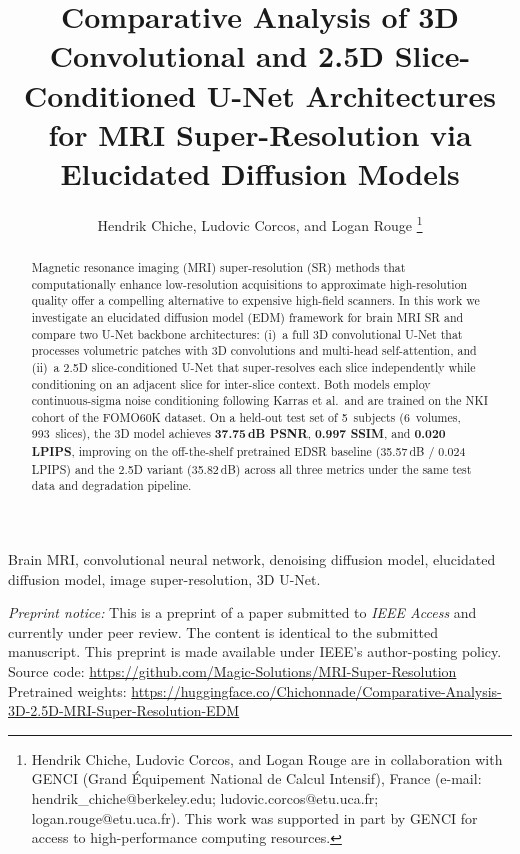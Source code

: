 \documentclass[10pt,journal]{IEEEtran}
\begin{document}
\title{Comparative Analysis of 3D Convolutional and 2.5D Slice-Conditioned
U-Net Architectures for MRI Super-Resolution via Elucidated Diffusion Models}

\author{Hendrik Chiche, Ludovic Corcos, and Logan Rouge%
\thanks{Hendrik Chiche, Ludovic Corcos, and Logan Rouge are in collaboration with GENCI (Grand \'{E}quipement National de Calcul Intensif), France (e-mail: hendrik\_chiche@berkeley.edu; ludovic.corcos@etu.uca.fr; logan.rouge@etu.uca.fr). This work was supported in part by GENCI for access to high-performance computing resources.}%
}

\begin{abstract}
Magnetic resonance imaging (MRI) super-resolution (SR) methods that
computationally enhance low-resolution acquisitions to approximate
high-resolution quality offer a compelling alternative to expensive
high-field scanners.
In this work we investigate an elucidated diffusion model (EDM) framework
for brain MRI SR and compare two U-Net backbone architectures:
(i)~a full 3D convolutional U-Net that processes volumetric patches
with 3D convolutions and multi-head self-attention, and
(ii)~a 2.5D slice-conditioned U-Net that super-resolves each slice
independently while conditioning on an adjacent slice for inter-slice
context.  Both models employ continuous-sigma noise conditioning following
Karras et al.\ and are trained on the NKI cohort of the FOMO60K dataset.
On a held-out test set of 5~subjects (6~volumes, 993~slices), the 3D model achieves
\textbf{37.75\,dB PSNR}, \textbf{0.997 SSIM}, and \textbf{0.020 LPIPS},
improving on the off-the-shelf pretrained EDSR baseline
(35.57\,dB / 0.024 LPIPS) and the 2.5D variant (35.82\,dB) across all
three metrics under the same test data and degradation pipeline.
\end{abstract}

\begin{IEEEkeywords}
Brain MRI, convolutional neural network, denoising diffusion model,
elucidated diffusion model, image super-resolution, 3D U-Net.
\end{IEEEkeywords}

\maketitle

\begin{center}
\begin{minipage}{0.98\linewidth}
\footnotesize
\raggedright
\textit{Preprint notice:} This is a preprint of a paper submitted to
\textit{IEEE Access} and currently under peer review. The content is
identical to the submitted manuscript. This preprint is made available
under IEEE's author-posting policy.\\[2pt]
Source code: \url{https://github.com/Magic-Solutions/MRI-Super-Resolution}\\
Pretrained weights: \url{https://huggingface.co/Chichonnade/Comparative-Analysis-3D-2.5D-MRI-Super-Resolution-EDM}
\end{minipage}
\end{center}
\end{document}
